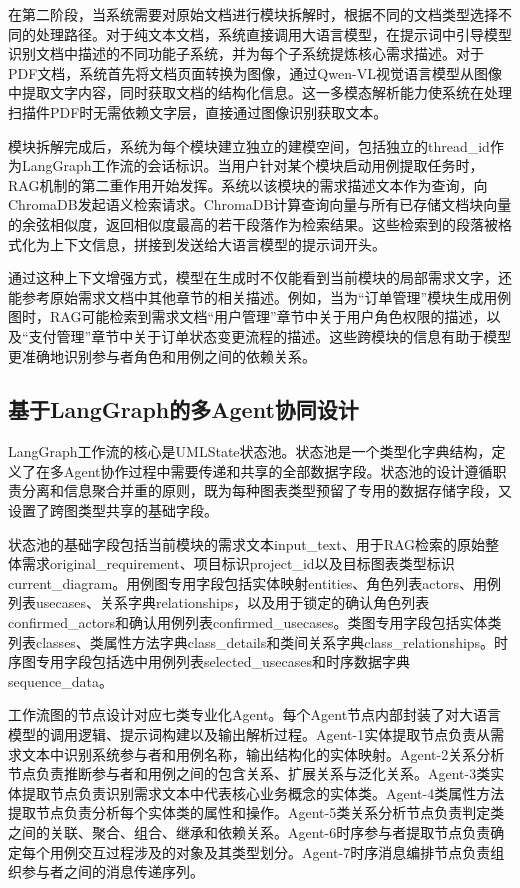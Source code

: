 在第二阶段，当系统需要对原始文档进行模块拆解时，根据不同的文档类型选择不同的处理路径。对于纯文本文档，系统直接调用大语言模型，在提示词中引导模型识别文档中描述的不同功能子系统，并为每个子系统提炼核心需求描述。对于PDF文档，系统首先将文档页面转换为图像，通过Qwen-VL视觉语言模型从图像中提取文字内容，同时获取文档的结构化信息。这一多模态解析能力使系统在处理扫描件PDF时无需依赖文字层，直接通过图像识别获取文本。

模块拆解完成后，系统为每个模块建立独立的建模空间，包括独立的thread\_id作为LangGraph工作流的会话标识。当用户针对某个模块启动用例提取任务时，RAG机制的第二重作用开始发挥。系统以该模块的需求描述文本作为查询，向ChromaDB发起语义检索请求。ChromaDB计算查询向量与所有已存储文档块向量的余弦相似度，返回相似度最高的若干段落作为检索结果。这些检索到的段落被格式化为上下文信息，拼接到发送给大语言模型的提示词开头。

通过这种上下文增强方式，模型在生成时不仅能看到当前模块的局部需求文字，还能参考原始需求文档中其他章节的相关描述。例如，当为“订单管理”模块生成用例图时，RAG可能检索到需求文档“用户管理”章节中关于用户角色权限的描述，以及“支付管理”章节中关于订单状态变更流程的描述。这些跨模块的信息有助于模型更准确地识别参与者角色和用例之间的依赖关系。

\subsection{基于LangGraph的多Agent协同设计}

LangGraph工作流的核心是UMLState状态池。状态池是一个类型化字典结构，定义了在多Agent协作过程中需要传递和共享的全部数据字段。状态池的设计遵循职责分离和信息聚合并重的原则，既为每种图表类型预留了专用的数据存储字段，又设置了跨图类型共享的基础字段。

状态池的基础字段包括当前模块的需求文本input\_text、用于RAG检索的原始整体需求original\_requirement、项目标识project\_id以及目标图表类型标识current\_diagram。用例图专用字段包括实体映射entities、角色列表actors、用例列表usecases、关系字典relationships，以及用于锁定的确认角色列表confirmed\_actors和确认用例列表confirmed\_usecases。类图专用字段包括实体类列表classes、类属性方法字典class\_details和类间关系字典class\_relationships。时序图专用字段包括选中用例列表selected\_usecases和时序数据字典sequence\_data。

工作流图的节点设计对应七类专业化Agent。每个Agent节点内部封装了对大语言模型的调用逻辑、提示词构建以及输出解析过程。Agent-1实体提取节点负责从需求文本中识别系统参与者和用例名称，输出结构化的实体映射。Agent-2关系分析节点负责推断参与者和用例之间的包含关系、扩展关系与泛化关系。Agent-3类实体提取节点负责识别需求文本中代表核心业务概念的实体类。Agent-4类属性方法提取节点负责分析每个实体类的属性和操作。Agent-5类关系分析节点负责判定类之间的关联、聚合、组合、继承和依赖关系。Agent-6时序参与者提取节点负责确定每个用例交互过程涉及的对象及其类型划分。Agent-7时序消息编排节点负责组织参与者之间的消息传递序列。

